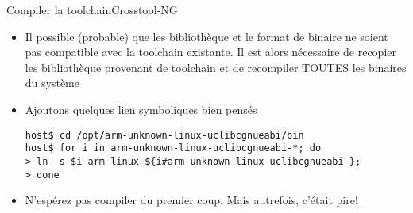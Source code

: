 \begin{frame}[fragile=singleslide]{Compiler la toolchain}{Crosstool-NG}
  \begin{itemize}
      \item Il  possible (probable) que les bibliothèque  et le format
        de  binaire  ne  soient   pas  compatible  avec  la  toolchain
        existante.    Il  est   alors  nécessaire   de   recopier  les
        bibliothèque  provenant de toolchain  et de  recompiler TOUTES
        les binaires du système
      \item Ajoutons quelques lien symboliques bien pensés
       \begin{lstlisting}[basicstyle=\ttfamily\scriptsize\color{colBasic}]
host$ cd /opt/arm-unknown-linux-uclibcgnueabi/bin
host$ for i in arm-unknown-linux-uclibcgnueabi-*; do 
> ln -s $i arm-linux-${i#arm-unknown-linux-uclibcgnueabi-}; 
> done
	\end{lstlisting}
      \item N'espérez  pas compiler  du premier coup.  Mais autrefois,
        c'était pire!
      \end{itemize}
\end{frame}




